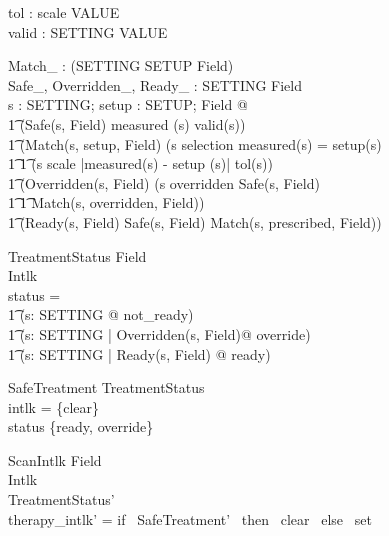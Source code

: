 \begin{axdef}
tol : scale \fun VALUE \\
valid : SETTING \fun \power VALUE
\end{axdef}

\begin{axdef}
Match\_ : \power(SETTING \cross SETUP \cross Field) \\
Safe\_, Overridden\_, Ready\_ : SETTING \rel Field \\
\where \forall s : SETTING; setup : SETUP; Field @ \\
\t1 (Safe(s, \theta Field) \iff measured (s) \in valid(s)) \land\\
\t1 (Match(s, setup, \theta Field) \iff (s \in selection \land
measured(s) = setup(s) \lor \\
\t1 \t1 (s \in scale \land |measured(s) - setup (s)| \leq
tol(s))\land \\
\t1 (Overridden(s, \theta Field) \iff (s \in \dom overridden \land
Safe(s, \theta Field) \land \\
\t1 \t1 Match(s, overridden, \theta Field)) \land \\
\t1 (Ready(s, \theta Field) \iff Safe(s, \theta Field) \land
Match(s, prescribed, \theta Field))
\end{axdef}

\begin{schema}{TreatmentStatus}
Field \\
Intlk \\
\where status = \\
\t1 (\lambda s: SETTING @ not\_ready) \oplus \\
\t1 (\lambda s: SETTING | Overridden(s, \theta Field)@ override)
\oplus \\
\t1 (\lambda s: SETTING | Ready(s, \theta Field) @ ready)
\end{schema}

\begin{schema}{SafeTreatment}
TreatmentStatus \\
\where \ran intlk = \{clear\} \\
\ran status \subseteq \{ready, override\}
\end{schema}

\begin{schema}{ScanIntlk}
\Xi Field \\
\Delta Intlk \\
\where TreatmentStatus' \\
therapy\_intlk' = if \, SafeTreatment' \, then \, clear \, else \,
set
\end{schema}


